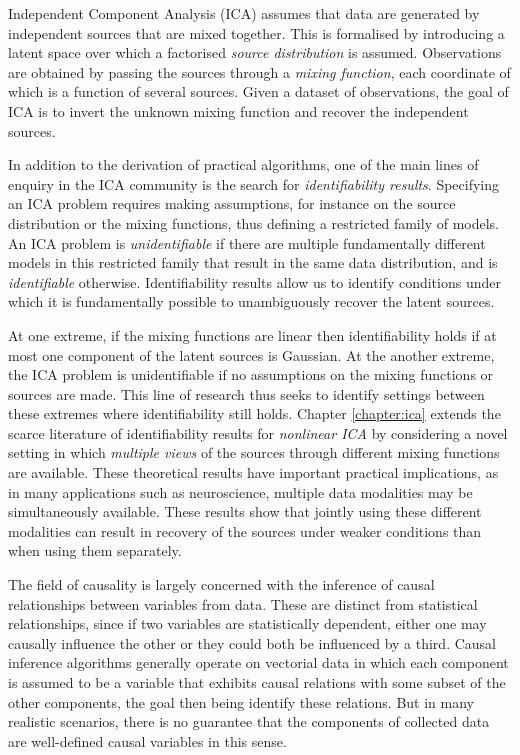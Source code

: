 Independent Component Analysis (ICA) assumes that data are generated by independent sources that are mixed together. 
This is formalised by introducing a latent space over which a factorised \emph{source distribution} is assumed. 
Observations are obtained by passing the sources through a \emph{mixing function}, each coordinate of which is a function of several sources.
Given a dataset of observations, the goal of ICA is to invert the unknown mixing function and recover the independent sources.

In addition to the derivation of practical algorithms, one of the main lines of enquiry in the ICA community is the search for \emph{identifiability results}.
Specifying an ICA problem requires making assumptions, for instance on the source distribution or the mixing functions, thus defining a restricted family of models.
An ICA problem is \emph{unidentifiable} if there are multiple fundamentally different models in this restricted family that result in the same data distribution, and is \emph{identifiable} otherwise.
Identifiability results allow us to identify conditions under which it is fundamentally possible to unambiguously recover the latent sources.


At one extreme, if the mixing functions are linear then identifiability holds if at most one component of the latent sources is Gaussian. 
At the another extreme, the ICA problem is unidentifiable if no assumptions on the mixing functions or sources are made. 
This line of research thus seeks to identify settings between these extremes where identifiability still holds. 
Chapter \ref{chapter:ica} extends the scarce literature of identifiability results for \emph{nonlinear ICA} by considering a novel setting in which \emph{multiple views} of the sources through different mixing functions are available.
These theoretical results have important practical implications, as in many applications such as neuroscience, multiple data modalities may be simultaneously available.
These results show that jointly using these different modalities can result in recovery of the sources under weaker conditions than when using them separately.

The field of causality is largely concerned with the inference of causal relationships between variables from data. 
These are distinct from statistical relationships, since if two variables are statistically dependent, either one may causally influence the other or they could both be influenced by a third.
Causal inference algorithms generally operate on vectorial data in which each component is assumed to be a variable that exhibits causal relations with some subset of the other components, the goal then being identify these relations.
But in many realistic scenarios, there is no guarantee that the components of collected data are well-defined causal variables in this sense.

